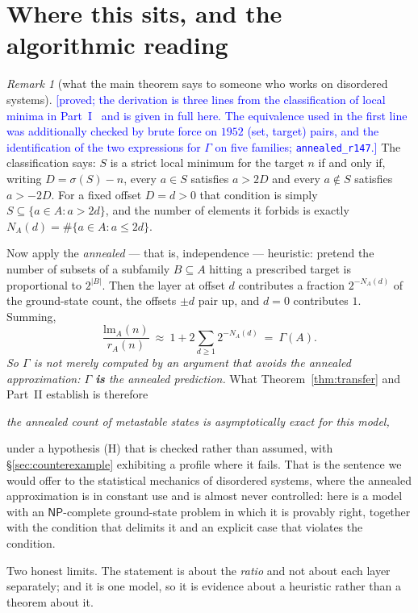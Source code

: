 \documentclass[11pt,a4paper]{article}
\theoremstyle{plain}
\theoremstyle{definition}
\theoremstyle{remark}
\newtheorem{remark}[theorem]{Remark}
\newcommand{\STATUS}[1]{\textcolor{blue}{\textsf{[#1]}}}
\begin{document}
\section{Where this sits, and the algorithmic reading}\label{sec:outlook}

\begin{remark}[what the main theorem says to someone who works on disordered systems]\label{rem:annealed}
\STATUS{proved; the derivation is three lines from the classification of local minima in
Part~I~\cite{P1} and is given in full here. The equivalence used in the first line was
additionally checked by brute force on $1952$ (set, target) pairs, and the identification of the
two expressions for $\Gamma$ on five families; \texttt{annealed\_r147}.}
The classification says: $S$ is a strict local minimum for the target $n$ if and only if, writing
$D=\sigma(S)-n$, every $a\in S$ satisfies $a>2D$ and every $a\notin S$ satisfies $a>-2D$. For a
fixed offset $D=d>0$ that condition is simply $S\subseteq\{a\in A: a>2d\}$, and the number of
elements it forbids is exactly $N_A(d)=\#\{a\in A: a\le 2d\}$.

Now apply the \emph{annealed} --- that is, independence --- heuristic: pretend the number of
subsets of a subfamily $B\subseteq A$ hitting a prescribed target is proportional to $2^{|B|}$.
Then the layer at offset $d$ contributes a fraction $2^{-N_A(d)}$ of the ground-state count, the
offsets $\pm d$ pair up, and $d=0$ contributes $1$. Summing,
\[
  \frac{\mathrm{lm}_A(n)}{r_A(n)}\ \approx\ 1+2\sum_{d\ge1}2^{-N_A(d)}\ =\ \Gamma(A).
\]
\emph{So $\Gamma$ is not merely computed by an argument that avoids the annealed approximation:
$\Gamma$ \textbf{is} the annealed prediction.} What Theorem~\ref{thm:transfer} and Part~II
establish is therefore
\begin{center}
\emph{the annealed count of metastable states is asymptotically exact for this model,}
\end{center}
under a hypothesis \textup{(H)} that is checked rather than assumed, with
\S\ref{sec:counterexample} exhibiting a profile where it fails. That is the sentence we would
offer to the statistical mechanics of disordered systems, where the annealed approximation is in
constant use and is almost never controlled: here is a model with an $\mathsf{NP}$-complete
ground-state problem in which it is provably right, together with the condition that delimits it
and an explicit case that violates the condition.

Two honest limits. The statement is about the \emph{ratio} and not about each layer separately;
and it is one model, so it is evidence about a heuristic rather than a theorem about it.
\end{remark}
\end{document}
